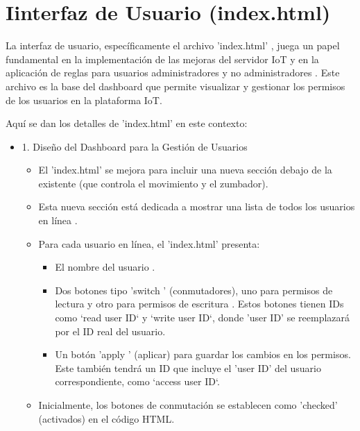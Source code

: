 \documentclass{report}
\begin{document}
\section{Iinterfaz de Usuario (index.html)}
La interfaz de usuario, específicamente el archivo  'index.html' , juega un papel fundamental en la implementación de las  mejoras del servidor IoT  
y en la aplicación de  reglas para usuarios administradores y no administradores . Este archivo es la base del  dashboard  que permite visualizar 
y gestionar los permisos de los usuarios en la plataforma IoT.

Aquí se dan los detalles de 'index.html' en este contexto:
\begin{itemize}
    \item 1. Diseño del Dashboard para la Gestión de Usuarios
    \begin{itemize}
        \item El 'index.html' se mejora para incluir una  nueva sección debajo de la existente  (que controla el movimiento y el zumbador).
        \item Esta nueva sección está dedicada a mostrar una  lista de todos los usuarios en línea .
        \item Para cada usuario en línea, el 'index.html' presenta:
        \begin{itemize}
            \item El  nombre del usuario .
            \item Dos botones tipo  'switch '  (conmutadores), uno para  permisos de lectura  y otro para  permisos de escritura . Estos botones tienen 
            IDs como `read user ID` y `write user ID`, donde 'user ID' se reemplazará por el ID real del usuario.
            \item Un  botón  'apply '  (aplicar) para guardar los cambios en los permisos. Este también tendrá un ID que incluye el 'user ID' del 
            usuario correspondiente, como `access user ID`.
        \end{itemize}
        \item Inicialmente, los botones de conmutación se establecen como 'checked' (activados) en el código HTML.
    \end{itemize}


\end{itemize}
\end{document}
